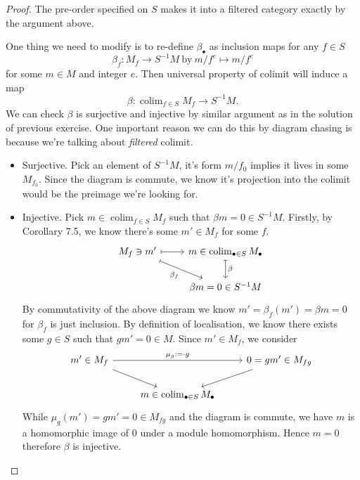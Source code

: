 \begin{proof}
    The pre-order specified on $S$ makes it into a filtered category exactly by the argument above. 

    One thing we need to modify is to re-define $\beta_{\bullet}$ as inclusion maps for any $f\in S$ 
    \[\beta_f:M_f\to S^{-1}M ~\text{by}~ m/f^e\mapsto m/f^e\] for some $m\in M$ and integer $e$. Then universal property of colimit will induce a map 
    \[\beta:\operatorname{colim}_{f\in S}M_f\to S^{-1}M.\]
    We can check $\beta$ is surjective and injective by similar argument as in the solution of previous exercise. One important reason we can do this by diagram chasing is because we're talking about \textit{filtered} colimit.
    \begin{itemize}
        \item Surjective. Pick an element of $S^{-1}M$, it's form $m/f_0$ implies it lives in some $M_{f_0}$. Since the diagram is commute, we know it's projection into the colimit would be the preimage we're looking for.
        \item Injective. Pick $m\in \operatorname{colim}_{f\in S}M_f$ such that $\beta m=0\in S^{-1}M$. Firstly, by Corollary 7.5, we know there's some $m'\in M_f$ for some $f$. 
\[\begin{tikzcd}
	{M_f\ni m'} & {m\in \operatorname{colim}_{\bullet\in S}M_{\bullet}} \\
	& {\beta m=0\in S^{-1}M}
	\arrow[maps to, from=1-1, to=1-2]
	\arrow["\beta", maps to, from=1-2, to=2-2]
	\arrow["{\beta_f}"', maps to, from=1-1, to=2-2]
\end{tikzcd}\]
        By commutativity of the above diagram we know $m'=\beta_f(m')=\beta m=0$ for $\beta_f$ is just inclusion. By definition of localisation, we know there exists some $g\in S$ such that $gm'=0\in M$. Since $m'\in M_f$, we consider 
\[\begin{tikzcd}
	{m'\in M_f} & {} & {0=gm'\in M_{fg}} \\
	& {m\in\operatorname{colim}_{\bullet\in S}M_{\bullet}}
	\arrow["{\mu_{g}:=\cdot g}", from=1-1, to=1-3]
	\arrow[from=1-1, to=2-2]
	\arrow[from=1-3, to=2-2]
\end{tikzcd}\]
        While $\mu_{g}(m')=gm'=0\in M_{fg}$ and the diagram is commute, we have $m$ is a homomorphic image of $0$ under a module homomorphism. Hence $m=0$ therefore $\beta$ is injective.

    \end{itemize}

\end{proof}

